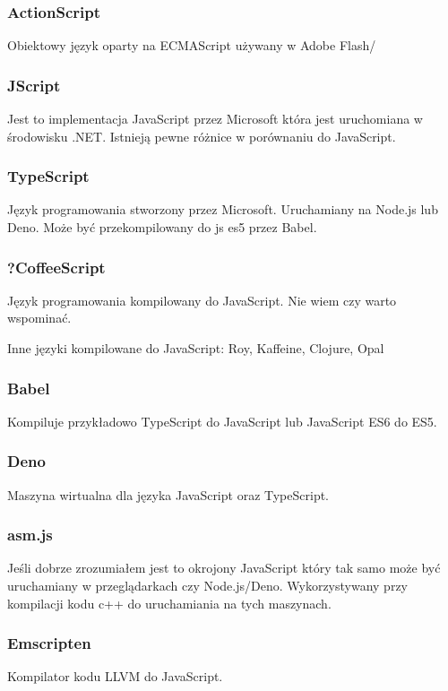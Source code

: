 \documentclass[a4paper]{article}
\begin{document}
\subsubsection{ActionScript}
Obiektowy język oparty na ECMAScript używany w Adobe Flash/

\subsubsection{JScript}
Jest to implementacja JavaScript przez Microsoft która jest uruchomiana w środowisku .NET.
Istnieją pewne różnice w porównaniu do JavaScript.

\subsubsection{TypeScript}
Język programowania stworzony przez Microsoft. Uruchamiany na Node.js lub Deno. Może być przekompilowany do js es5 przez Babel.

\subsubsection{?CoffeeScript}
Język programowania kompilowany do JavaScript.
Nie wiem czy warto wspominać.

Inne języki kompilowane do JavaScript: Roy, Kaffeine, Clojure, Opal

\subsubsection{Babel}
Kompiluje przykładowo TypeScript do JavaScript lub JavaScript ES6 do ES5.

\subsubsection{Deno}
Maszyna wirtualna dla języka JavaScript oraz TypeScript.

\subsubsection{asm.js}
Jeśli dobrze zrozumiałem jest to okrojony JavaScript który tak samo może być uruchamiany w przeglądarkach czy Node.js/Deno.
Wykorzystywany przy kompilacji kodu c++ do uruchamiania na tych maszynach.

\subsubsection{Emscripten}
Kompilator kodu LLVM do JavaScript.
\end{document}
